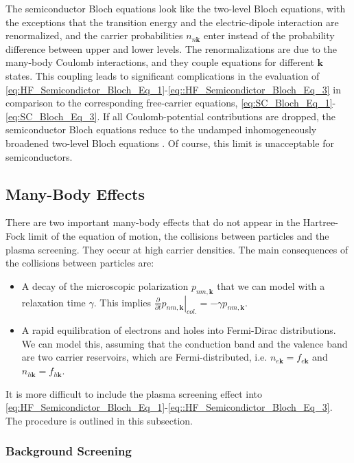 The semiconductor Bloch equations look like the two-level Bloch equations,
with the exceptions that the transition energy and the electric-dipole
interaction are renormalized, and the carrier probabilities $n_{n\mathbf{k}}$
enter instead of the probability difference between upper and lower
levels. The renormalizations are due to the many-body Coulomb interactions,
and they couple equations for different $\mathbf{k}$ states. This
coupling leads to significant complications in the evaluation of \ref{eq:HF_Semicondictor_Bloch_Eq_1}-\ref{eq::HF_Semicondictor_Bloch_Eq_3}
in comparison to the corresponding free-carrier equations, \ref{eq:SC_Bloch_Eq_1}-\ref{eq:SC_Bloch_Eq_3}.
If all Coulomb-potential contributions are dropped, the semiconductor
Bloch equations reduce to the undamped inhomogeneously broadened two-level
Bloch equations \citet{Chow}. Of course, this limit is unacceptable
for semiconductors. 


\subsection{Many-Body Effects}

There are two important many-body effects that do not appear in the
Hartree-Fock limit of the equation of motion, the collisions between
particles and the plasma screening. They occur at high carrier densities.
The main consequences of the collisions between particles are: 
\begin{itemize}
\item A decay of the microscopic polarization $p_{nm,\mathbf{k}}$ that
we can model with a relaxation time $\gamma$. This implies $\frac{\partial}{\partial t}\left.p_{nm,\mathbf{k}}\right|_{col.}=-\gamma p_{nm,\mathbf{k}}$. 
\item A rapid equilibration of electrons and holes into Fermi-Dirac distributions.
We can model this, assuming that the conduction band and the valence
band are two carrier reservoirs, which are Fermi-distributed, i.e.
$n_{e\mathbf{k}}=f_{e\mathbf{k}}$ and $n_{h\mathbf{k}}=f_{h\mathbf{k}}$.
\end{itemize}
It is more difficult to include the plasma screening effect into \ref{eq:HF_Semicondictor_Bloch_Eq_1}-\ref{eq::HF_Semicondictor_Bloch_Eq_3}.
The procedure is outlined in this subsection. 


\subsubsection{Background Screening}

